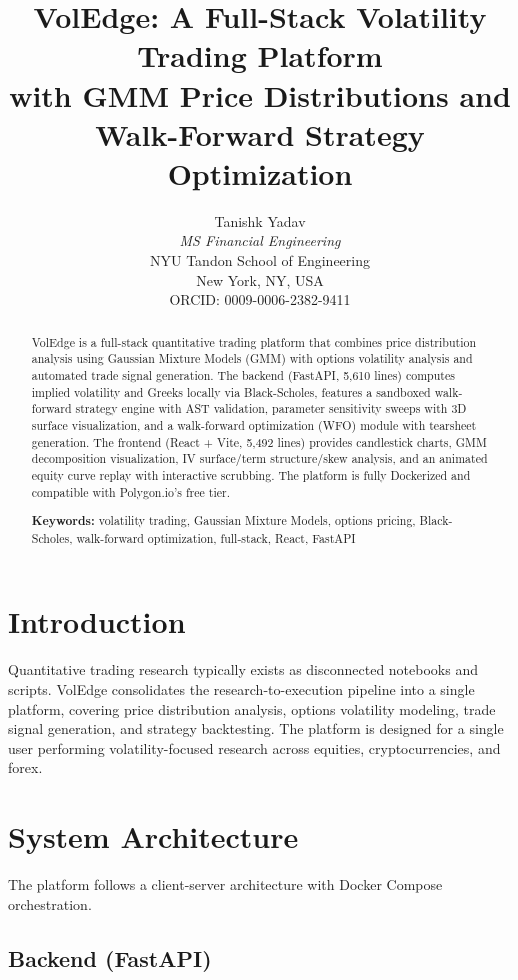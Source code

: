 \documentclass[11pt]{article}
\title{\textbf{VolEdge: A Full-Stack Volatility Trading Platform\\with GMM Price Distributions and\\Walk-Forward Strategy Optimization}}
\author{Tanishk Yadav\\[2pt]\textit{MS Financial Engineering}\\NYU Tandon School of Engineering\\New York, NY, USA\\[2pt]ORCID: 0009-0006-2382-9411}
\date{}
\begin{document}
\maketitle

\begin{abstract}
\noindent
VolEdge is a full-stack quantitative trading platform that combines price distribution analysis using Gaussian Mixture Models (GMM) with options volatility analysis and automated trade signal generation. The backend (FastAPI, 5,610 lines) computes implied volatility and Greeks locally via Black-Scholes, features a sandboxed walk-forward strategy engine with AST validation, parameter sensitivity sweeps with 3D surface visualization, and a walk-forward optimization (WFO) module with tearsheet generation. The frontend (React + Vite, 5,492 lines) provides candlestick charts, GMM decomposition visualization, IV surface/term structure/skew analysis, and an animated equity curve replay with interactive scrubbing. The platform is fully Dockerized and compatible with Polygon.io's free tier.

\medskip
\noindent\textbf{Keywords:} volatility trading, Gaussian Mixture Models, options pricing, Black-Scholes, walk-forward optimization, full-stack, React, FastAPI
\end{abstract}

\section{Introduction}

Quantitative trading research typically exists as disconnected notebooks and scripts. VolEdge consolidates the research-to-execution pipeline into a single platform, covering price distribution analysis, options volatility modeling, trade signal generation, and strategy backtesting. The platform is designed for a single user performing volatility-focused research across equities, cryptocurrencies, and forex.

\section{System Architecture}

The platform follows a client-server architecture with Docker Compose orchestration.

\subsection{Backend (FastAPI)}
\end{document}

